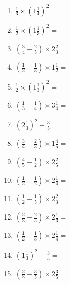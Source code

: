 \documentclass[12pt]{article}
\begin{document}
\begin{enumerate}
\item \large $ \frac{1}{3} \times \left( 1 \frac{1}{4} \right)^2 = $ \vspace{1.6cm}
\item \large $ \frac{1}{2} \times \left( 1 \frac{1}{3} \right)^2 = $ \vspace{1.6cm}
\item \large $ \left( \frac{3}{4} - \frac{2}{5} \right) \times 2 \frac{2}{3} = $ \vspace{1.6cm}
\item \large $ \left( \frac{1}{2} - \frac{1}{3} \right) \times 1 \frac{1}{2} = $ \vspace{1.6cm}
\item \large $ \frac{1}{2} \times \left( 1 \frac{1}{3} \right)^2 = $ \vspace{1.6cm}
\item \large $ \left( \frac{1}{3} - \frac{1}{4} \right) \times 3 \frac{1}{4} = $ \vspace{1.6cm}
\item \large $ \left( 2 \frac{1}{3} \right)^2 - \frac{3}{5} = $ \vspace{1.6cm}
\item \large $ \left( \frac{3}{4} - \frac{2}{3} \right) \times 1 \frac{4}{5} = $ \vspace{1.6cm}
\item \large $ \left( \frac{4}{5} - \frac{1}{2} \right) \times 2 \frac{2}{5} = $ \vspace{1.6cm}
\item \large $ \left( \frac{1}{2} - \frac{1}{2} \right) \times 2 \frac{1}{4} = $ \vspace{1.6cm}
\newpage
\item \large $ \left( \frac{1}{2} - \frac{1}{5} \right) \times 2 \frac{2}{3} = $ \vspace{1.6cm}
\item \large $ \left( \frac{2}{3} - \frac{2}{5} \right) \times 2 \frac{1}{3} = $ \vspace{1.6cm}
\item \large $ \left( \frac{1}{2} - \frac{1}{3} \right) \times 2 \frac{1}{4} = $ \vspace{1.6cm}
\item \large $ \left( 1 \frac{1}{3} \right)^2 + \frac{3}{5} = $ \vspace{1.6cm}
\item \large $ \left( \frac{2}{3} - \frac{3}{5} \right) \times 2 \frac{3}{5} = $ \vspace{1.6cm}

\end{enumerate}
\end{document}
